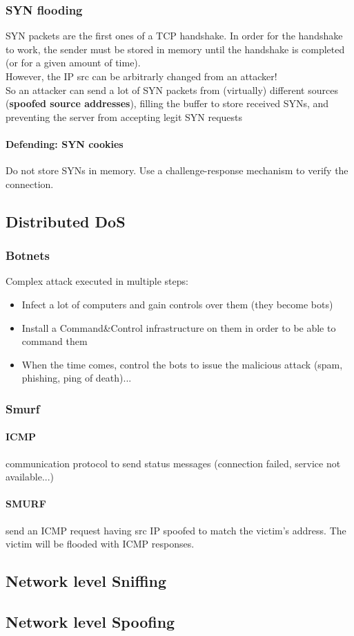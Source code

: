 \documentclass{article}
\begin{document}
\subsubsection{SYN flooding}
SYN packets are the first ones of a TCP handshake. In order for the handshake to work, the sender must be stored in memory until the handshake is completed (or for a given amount of time).\\
However, the IP src can be arbitrarly changed from an attacker!\\
So an attacker can send a lot of SYN packets from (virtually) different sources (\textbf{spoofed source addresses}), filling the buffer to store received SYNs, and preventing the server from accepting legit SYN requests
\paragraph{Defending: SYN cookies} Do not store SYNs in memory. Use a challenge-response mechanism to verify the connection.
\subsection{Distributed DoS}
\subsubsection{Botnets} Complex attack executed in multiple steps:
\begin{itemize}
\item Infect a lot of computers and gain controls over them (they become bots)
\item Install a Command\&Control infrastructure on them in order to be able to command them
\item When the time comes, control the bots to issue the malicious attack (spam, phishing, ping of death)...
\end{itemize}
\subsubsection{Smurf}
\paragraph{ICMP} communication protocol to send status messages (connection failed, service not available...)
\paragraph{SMURF} send an ICMP request having src IP spoofed to match the victim's address. The victim will be flooded with ICMP responses.

\subsection{Network level Sniffing}

\subsection{Network level Spoofing}
\end{document}
